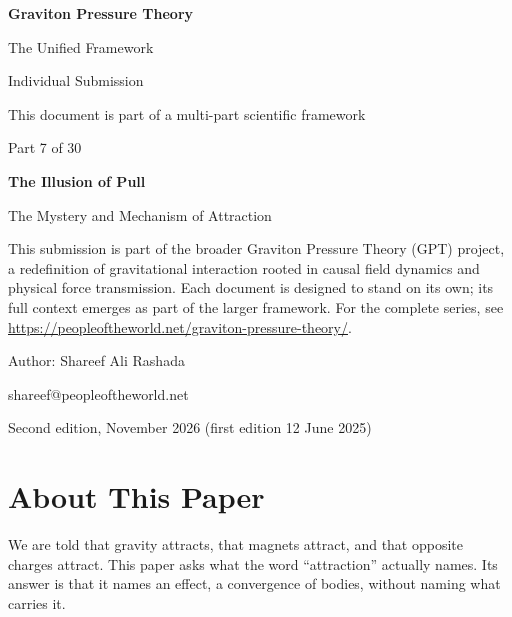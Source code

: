 \documentclass[11pt,a4paper]{article}
\begin{document}
\renewcommand{\thetable}{7.\arabic{table}}
\begin{titlepage}
\centering
\vspace*{1.5cm}
{\Huge\bfseries Graviton Pressure Theory\par}
\vspace{0.4cm}
{\Large The Unified Framework\par}
{\large Individual Submission\par}
\vspace{0.3cm}
{\normalsize This document is part of a multi-part scientific framework\par}
\vspace{1.6cm}
{\large Part 7 of 30\par}
\vspace{0.6cm}
{\huge\bfseries The Illusion of Pull\par}
\vspace{0.5cm}
{\Large The Mystery and Mechanism of Attraction\par}
\vspace{1.4cm}
\begin{minipage}{0.82\textwidth}\centering\small
This submission is part of the broader Graviton Pressure Theory (GPT) project, a redefinition of gravitational interaction rooted in causal field dynamics and physical force transmission. Each document is designed to stand on its own; its full context emerges as part of the larger framework. For the complete series, see \url{https://peopleoftheworld.net/graviton-pressure-theory/}.
\end{minipage}
\vfill
{\large Author: Shareef Ali Rashada\par}
{\normalsize shareef@peopleoftheworld.net\par}
\vspace{0.3cm}
{\normalsize Second edition, November 2026 \quad (first edition 12 June 2025)\par}
\end{titlepage}

\tableofcontents
\newpage

\section*{About This Paper}

We are told that gravity attracts, that magnets attract, and that opposite charges attract. This paper asks what the word ``attraction'' actually names. Its answer is that it names an effect, a convergence of bodies, without naming what carries it.
\end{document}
